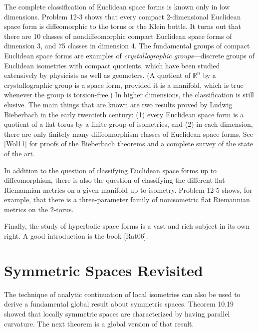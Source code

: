 The complete classification of Euclidean space forms is known only in low dimensions. Problem 12-3 shows that every compact 2-dimensional Euclidean space form is diffeomorphic to the torus or the Klein bottle. It turns out that there are 10 classes of nondiffeomorphic compact Euclidean space forms of dimension 3, and 75 classes in dimension 4. The fundamental groups of compact Euclidean space forms are examples of \emph{crystallographic groups}---discrete groups of Euclidean isometries with compact quotients, which have been studied extensively by physicists as well as geometers. (A quotient of $\mathbb{R}^n$ by a crystallographic group is a space form, provided it is a manifold, which is true whenever the group is torsion-free.) In higher dimensions, the classification is still elusive. The main things that are known are two results proved by Ludwig Bieberbach in the early twentieth century: (1) every Euclidean space form is a quotient of a flat torus by a finite group of isometries, and (2) in each dimension, there are only finitely many diffeomorphism classes of Euclidean space forms. See [Wol11] for proofs of the Bieberbach theorems and a complete survey of the state of the art.

In addition to the question of classifying Euclidean space forms up to diffeomorphism, there is also the question of classifying the different flat Riemannian metrics on a given manifold up to isometry. Problem 12-5 shows, for example, that there is a three-parameter family of nonisometric flat Riemannian metrics on the 2-torus.

Finally, the study of hyperbolic space forms is a vast and rich subject in its own right. A good introduction is the book [Rat06].

\section{Symmetric Spaces Revisited}

The technique of analytic continuation of local isometries can also be used to derive a fundamental global result about symmetric spaces. Theorem 10.19 showed that locally symmetric spaces are characterized by having parallel curvature. The next theorem is a global version of that result.

